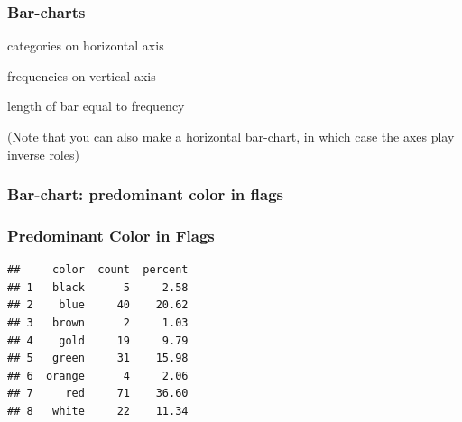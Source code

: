 \documentclass[12pt]{beamer}\usepackage[]{graphicx}\usepackage[]{color}
\makeatletter
\newenvironment{kframe}{%
 \def\at@end@of@kframe{}%
 \ifinner\ifhmode%
  \def\at@end@of@kframe{\end{minipage}}%
  \begin{minipage}{\columnwidth}%
 \fi\fi%
 \def\FrameCommand##1{\hskip\@totalleftmargin \hskip-\fboxsep
 \colorbox{shadecolor}{##1}\hskip-\fboxsep
     \hskip-\linewidth \hskip-\@totalleftmargin \hskip\columnwidth}%
 \MakeFramed {\advance\hsize-\width
   \@totalleftmargin\z@ \linewidth\hsize
   \@setminipage}}%
 {\par\unskip\endMakeFramed%
 \at@end@of@kframe}
\newenvironment{knitrout}{}{} %
\makeatother
\begin{document}

\begin{frame}
\frametitle{Bar-charts}

\bi
  \item categories on horizontal axis
  \item frequencies on vertical axis
  \item length of bar equal to frequency
\ei
\eb

(Note that you can also make a horizontal bar-chart, in which case the axes play inverse roles)
\end{frame}


\begin{frame}
\frametitle{Bar-chart: predominant color in flags}
\begin{center}
\end{center}
\end{frame}


\begin{frame}[fragile]
\frametitle{Predominant Color in Flags}



\begin{knitrout}\footnotesize
{}\color{fgcolor}\begin{kframe}
\begin{verbatim}
##     color  count  percent
## 1   black      5     2.58
## 2    blue     40    20.62
## 3   brown      2     1.03
## 4    gold     19     9.79
## 5   green     31    15.98
## 6  orange      4     2.06
## 7     red     71    36.60
## 8   white     22    11.34
\end{verbatim}
\end{kframe}
\end{knitrout}

\end{frame}

\end{document}
